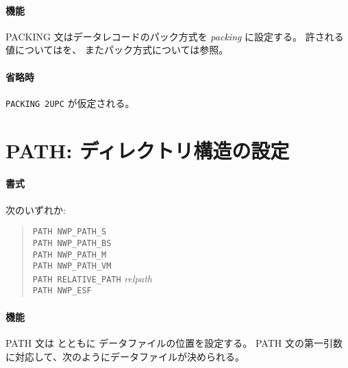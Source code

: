 \paragraph{機能}
PACKING 文はデータレコードのパック方式を {\it packing} に設定する。
許される値についてはを、
またパック方式については参照。

\paragraph{省略時}
{\tt PACKING 2UPC} が仮定される。

\section{PATH: ディレクトリ構造の設定}
\label{sec:def:PATH}
\paragraph{書式}
次のいずれか:
\begin{quote}
{\tt PATH NWP\_PATH\_S} \\
{\tt PATH NWP\_PATH\_BS} \\
{\tt PATH NWP\_PATH\_M} \\
{\tt PATH NWP\_PATH\_VM} \\
{\tt PATH RELATIVE\_PATH} {\it relpath} \\
{\tt PATH NWP\_ESF}
\end{quote}
\paragraph{機能}
PATH 文は  とともに
データファイルの位置を設定する。
PATH 文の第一引数に対応して、次のようにデータファイルが決められる。

